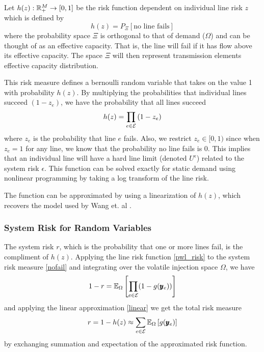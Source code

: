 Let $h(z) : \mathbb{R}^{M}_+ \rightarrow \left[ 0, 1 \right]$ be the risk function dependent on individual line risk $z$ which is defined by
\[ h(z) = P_\Xi \left[ \mbox{no line fails} \right] \]
where the probability space $\Xi$ is orthogonal to that of demand ($\Omega$) and can be thought of as an effective capacity.  That is, the line will fail if it has flow above its effective capacity.  The space $\Xi$ will then represent transmission elements effective capacity distribution.  

This risk measure defines a bernoulli random variable that takes on the value 1 with probability $h(z)$.  By multiplying the probabilities that individual lines succeed $(1-z_e)$, we have the probability that all lines succeed
\begin{equation}  \label{nofail}
h(z) = \prod_{e \in \mathcal{E}} \left( 1 - z_e \right)
\end{equation}  
where $z_e$ is the probability that line $e$ fails.  Also, we restrict $z_e \in [0,1)$ since when $z_e = 1$ for any line, we know that the probability no line fails is 0.  This implies that an individual line will have a hard line limit (denoted $U^\epsilon$) related to the system risk $\epsilon$.
\endnote{}
This function can be solved exactly for static demand using nonlinear programming by taking a log transform of the line risk.
\endnote{}

The function can be approximated by using a linearization of $h(z)$,
\endnote{}
which recovers the model used by Wang et. al \cite{wang_2013}.


\subsubsection*{System Risk for Random Variables}
The system risk $r$, which is the probability that one or more lines fail, is the compliment of $h(z)$.  Applying the line risk function \ref{pwl_risk} to the system risk measure \ref{nofail} and integrating over the volatile injection space $\Omega$, we have
\begin{equation*}
1- r = \mathbb{E}_{\Omega} \left[  \prod_{e \in \mathcal{E}} (1 - g(\pmb{y}_e) ) \right]
\end{equation*}
and applying the linear approximation \ref{linear} we get the total risk measure
\begin{equation}
r = 1 - h(z) \approx \sum_{e \in \mathcal{E}} \mathbb{E}_{\Omega} \left[ g(\pmb{y}_e) \right]
\end{equation}
by exchanging summation and expectation of the approximated risk function. 

